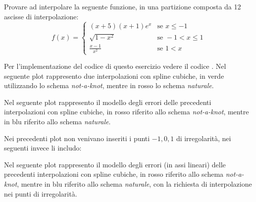 \begin{exercise} 
Provare ad interpolare la seguente funzione, in una partizione composta da 12
ascisse di interpolazione:
\begin{displaymath}
f(x) = \left \lbrace 
\begin{matrix}
	(x+5)(x+1)e^{x} & \text{se } x \leq -1 \\
	\sqrt{1 - x^{2}} & \text{se } -1 < x \leq 1 \\
	\frac{x-1}{x^{2}} & \text{se } 1 < x
\end{matrix} 
\right. 
\end{displaymath}
\end{exercise}
Per l'implementazione del codice di questo esercizio vedere il codice
.
Nel seguente plot rappresento due interpolazioni con spline cubiche, in verde
utilizzando lo schema \emph{not-a-knot}, mentre in rosso lo schema
\emph{naturale}.
\begin{center}   

\end{center}
Nel seguente plot rappresento il modello degli errori delle precedenti
interpolazioni con spline cubiche, in rosso riferito allo
schema \emph{not-a-knot}, mentre in blu riferito allo schema \emph{naturale}.
\begin{center}   

\end{center}
Nei precedenti plot non venivano inseriti i punti $-1, 0, 1$ di irregolarit\`a,
nei seguenti invece li includo:
\begin{center}   

\end{center}
Nel seguente plot rappresento il modello degli errori (in assi lineari) delle
precedenti interpolazioni con spline cubiche, in rosso riferito allo
schema \emph{not-a-knot}, mentre in blu riferito allo schema \emph{naturale},
con la richiesta di interpolazione nei punti di irregolarit\`a.
\begin{center}   

\end{center}

